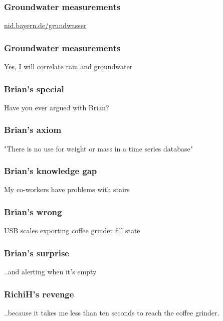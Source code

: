 \documentclass[t]{beamer}
\begin{document}
\begin{frame}
	\frametitle{Groundwater measurements}
	\vfill
	\centerline{\url{nid.bayern.de/grundwasser}}
	\vfill
\end{frame}

\begin{frame}
	\frametitle{Groundwater measurements}
	\vfill
	\centerline{Yes, I will correlate rain and groundwater}
	\vfill
\end{frame}

\begin{frame}
	\frametitle{Brian's special}
	\vfill
	\centerline{Have you ever argued with Brian?}
	\vfill
\end{frame}

\begin{frame}
	\frametitle{Brian's axiom}
	\vfill
	\centerline{"There is no use for weight or mass in a time series database"}
	\vfill
\end{frame}

\begin{frame}
	\frametitle{Brian's knowledge gap}
	\vfill
	\centerline{My co-workers have problems with stairs}
	\vfill
\end{frame}

\begin{frame}
	\frametitle{Brian's wrong}
	\vfill
	\centerline{USB scales exporting coffee grinder fill state}
	\vfill
\end{frame}

\begin{frame}
	\frametitle{Brian's surprise}
	\vfill
	\centerline{..and alerting when it's empty}
	\vfill
\end{frame}

\begin{frame}
	\frametitle{RichiH's revenge}
	\vfill
	\centerline{..because it takes me less than ten seconds to reach the coffee grinder.}
	\vfill
\end{frame}
\end{document}
